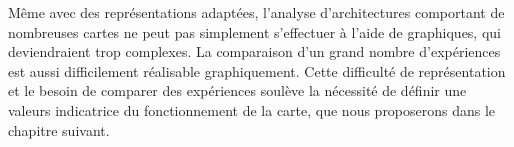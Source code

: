 \documentclass[../main]{subfiles}
\begin{document}
Même avec des représentations adaptées, l'analyse d'architectures comportant de nombreuses cartes ne peut pas simplement s'effectuer à l'aide de graphiques, qui deviendraient trop complexes. La comparaison d'un grand nombre d'expériences est aussi difficilement réalisable graphiquement.
Cette difficulté de représentation et le besoin de comparer des expériences soulève la nécessité de définir une valeurs indicatrice du fonctionnement de la carte, que nous proposerons dans le chapitre suivant.





\end{document}
